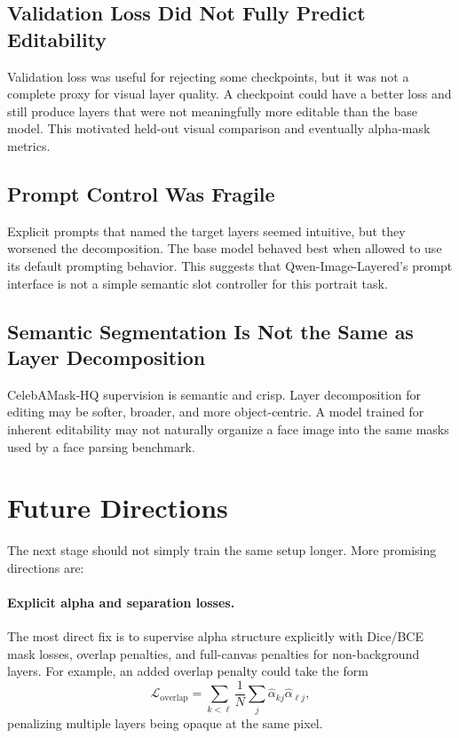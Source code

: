 \documentclass[11pt]{article}
\begin{document}
\subsection{Validation Loss Did Not Fully Predict Editability}

Validation loss was useful for rejecting some checkpoints, but it was not a
complete proxy for visual layer quality. A checkpoint could have a better loss and
still produce layers that were not meaningfully more editable than the base model.
This motivated held-out visual comparison and eventually alpha-mask metrics.

\subsection{Prompt Control Was Fragile}

Explicit prompts that named the target layers seemed intuitive, but they worsened
the decomposition. The base model behaved best when allowed to use its default
prompting behavior. This suggests that Qwen-Image-Layered's prompt interface is
not a simple semantic slot controller for this portrait task.

\subsection{Semantic Segmentation Is Not the Same as Layer Decomposition}

CelebAMask-HQ supervision is semantic and crisp. Layer decomposition for editing
may be softer, broader, and more object-centric. A model trained for inherent
editability may not naturally organize a face image into the same masks used by a
face parsing benchmark.

\section{Future Directions}

The next stage should not simply train the same setup longer. More promising
directions are:

\paragraph{Explicit alpha and separation losses.}
The most direct fix is to supervise alpha structure explicitly with Dice/BCE mask
losses, overlap penalties, and full-canvas penalties for non-background layers.
For example, an added overlap penalty could take the form
\begin{equation}
\mathcal{L}_{\mathrm{overlap}}
=
\sum_{k<\ell}
\frac{1}{N}
\sum_j
\hat{\alpha}_{kj}\hat{\alpha}_{\ell j},
\end{equation}
penalizing multiple layers being opaque at the same pixel.
\end{document}
